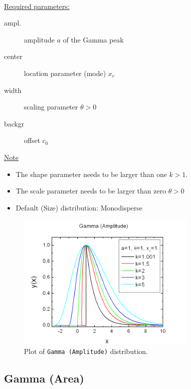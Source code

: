 ~\\

\uline{Required parameters:}
\begin{description}
    \item[ampl.] amplitude $a$ of the Gamma peak
    \item[center] location parameter (mode) $x_c$
    \item[width] scaling parameter $\theta>0$
    \item[backgr] offset $c_0$
\end{description}

\uline{Note}
\begin{itemize}
  \item The shape parameter needs to be larger than one $k>1$.
  \item The scale parameter needs to be larger than zero $\theta>0$
  \item Default (Size) distribution: Monodisperse
\end{itemize}

\begin{figure}[htb]
\begin{center}
\includegraphics[width=0.768\textwidth]{GammaAmplitude.png}
\end{center}
\caption{Plot of \texttt{Gamma (Amplitude)} distribution.}
\label{fig:GammaAmplitude}
\end{figure}

\vspace{5mm}

\subsection{Gamma (Area)} ~\\
\label{sec:GammaDistrArea}

